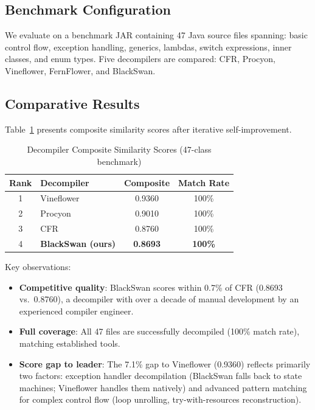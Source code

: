 \documentclass[conference,11pt]{IEEEtran}
\begin{document}
\subsection{Benchmark Configuration}

We evaluate on a benchmark JAR containing 47 Java source files spanning: basic control flow, exception handling, generics, lambdas, switch expressions, inner classes, and enum types. Five decompilers are compared: CFR, Procyon, Vineflower, FernFlower, and BlackSwan.

\subsection{Comparative Results}

Table~\ref{tab:results} presents composite similarity scores after iterative self-improvement.

\begin{table}[t]
\centering
\caption{Decompiler Composite Similarity Scores (47-class benchmark)}
\label{tab:results}
\footnotesize
\setlength{\tabcolsep}{3pt}
\begin{tabular}{@{}cp{}cc@{}}
\toprule
\textbf{Rank} & \textbf{Decompiler} & \textbf{Composite} & \textbf{Match Rate} \\
\midrule
1 & Vineflower & 0.9360 & 100\% \\
2 & Procyon & 0.9010 & 100\% \\
3 & CFR & 0.8760 & 100\% \\
4 & \textbf{BlackSwan (ours)} & \textbf{0.8693} & \textbf{100\%} \\
\bottomrule
\end{tabular}
\end{table}

Key observations:

\begin{itemize}
    \item \textbf{Competitive quality}: BlackSwan scores within 0.7\% of CFR (0.8693 vs.\ 0.8760), a decompiler with over a decade of manual development by an experienced compiler engineer.
    \item \textbf{Full coverage}: All 47 files are successfully decompiled (100\% match rate), matching established tools.
    \item \textbf{Score gap to leader}: The 7.1\% gap to Vineflower (0.9360) reflects primarily two factors: exception handler decompilation (BlackSwan falls back to state machines; Vineflower handles them natively) and advanced pattern matching for complex control flow (loop unrolling, try-with-resources reconstruction).
\end{itemize}
\end{document}
